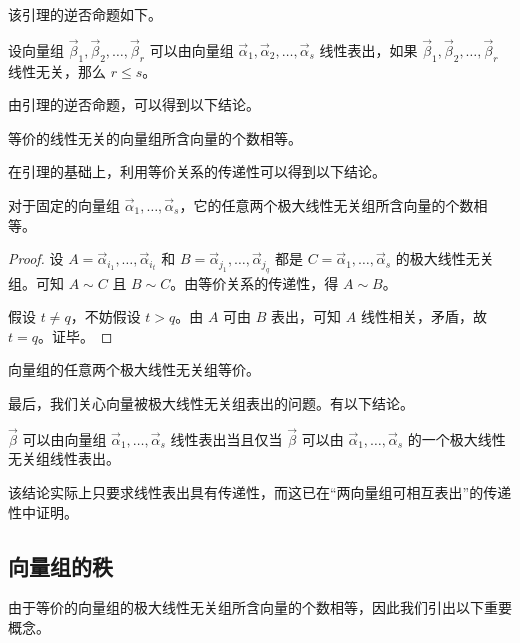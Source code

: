 该引理的逆否命题如下。

\begin{theorem}
	设向量组 $\vec \beta_1, \vec \beta_2, \ldots, \vec \beta_r$ 可以由向量组 $\vec \alpha_1, \vec \alpha_2, \ldots, \vec \alpha_s$ 线性表出，如果 $\vec \beta_1, \vec \beta_2, \ldots, \vec \beta_r$ 线性无关，那么 $r \le s$。
\end{theorem}

由引理的逆否命题，可以得到以下结论。

\begin{theorem}
	等价的线性无关的向量组所含向量的个数相等。
\end{theorem}

在引理的基础上，利用等价关系的传递性可以得到以下结论。

\begin{theorem}
	对于固定的向量组 $\vec \alpha_1, \ldots, \vec \alpha_s$，它的任意两个极大线性无关组所含向量的个数相等。
\end{theorem}

\begin{proof}
	设 $A = \vec \alpha_{i_1}, \ldots, \vec \alpha_{i_t}$ 和 $B = \vec \alpha_{j_1}, \ldots, \vec \alpha_{j_q}$ 都是 $C = \vec \alpha_1, \ldots, \vec \alpha_s$ 的极大线性无关组。可知 $A \sim C$ 且 $B \sim C$。由等价关系的传递性，得 $A \sim B$。

	假设 $t \ne q$，不妨假设 $t > q$。由 $A$ 可由 $B$ 表出，可知 $A$ 线性相关，矛盾，故 $t = q$。证毕。
\end{proof}

\begin{theorem}
	向量组的任意两个极大线性无关组等价。
\end{theorem}

最后，我们关心向量被极大线性无关组表出的问题。有以下结论。

\begin{theorem}
	$\vec \beta$ 可以由向量组 $\vec \alpha_1, \ldots, \vec \alpha_s$ 线性表出当且仅当 $\vec \beta$ 可以由 $\vec \alpha_1, \ldots, \vec \alpha_s$ 的一个极大线性无关组线性表出。
\end{theorem}

该结论实际上只要求线性表出具有传递性，而这已在“两向量组可相互表出”的传递性中证明。

\subsection{向量组的秩}

由于等价的向量组的极大线性无关组所含向量的个数相等，因此我们引出以下重要概念。

